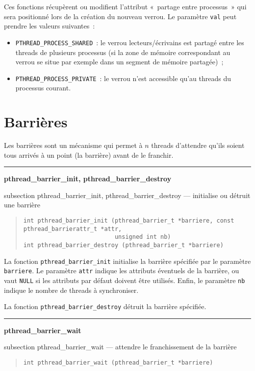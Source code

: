 \documentclass [twoside] {report}
\newcommand {\primitive} [1]
    {
	{\large \bf #1}
	\addcontentsline {toc} {subsection} {#1}
    }
\newcommand {\separation}
    {
	\vspace {7mm}
	\nopagebreak
	\hrule
    }
\begin{document}
Ces fonctions récupèrent ou modifient l'attribut «~partage entre
processus~» qui sera positionné lors de la création du nouveau
verrou. Le paramètre \texttt {val} peut prendre les valeurs suivantes~:

\begin {itemize}
    \item \verb|PTHREAD_PROCESS_SHARED|~: le verrou lecteurs/écrivains
	est partagé entre les threads de plusieurs processus (si la zone
	de mémoire correspondant au verrou se situe par exemple dans un
	segment de mémoire partagée)~;
    \item \verb|PTHREAD_PROCESS_PRIVATE|~: le verrou n'est accessible
	qu'au threads du processus courant.
\end {itemize}


\section {Barrières}

Les barrières sont un mécanisme qui permet à $n$ threads d'attendre
qu'ils soient tous arrivés à un point (la barrière) avant de le
franchir.

\separation
\primitive {pthread\_barrier\_init, pthread\_barrier\_destroy} --- initialise ou détruit une barrière

\begin {quote}
\begin {verbatim}
int pthread_barrier_init (pthread_barrier_t *barriere, const pthread_barrierattr_t *attr,
                          unsigned int nb)
int pthread_barrier_destroy (pthread_barrier_t *barriere)
\end{verbatim}
\end {quote}

La fonction \verb|pthread_barrier_init| initialise la barrière
spécifiée par le paramètre \texttt {barriere}.  Le paramètre \texttt
{attr} indique les attributs éventuels de la barrière, ou vaut \texttt
{NULL} si les attributs par défaut doivent être utilisés. Enfin,
le paramètre \texttt {nb} indique le nombre de threads à synchroniser.

La fonction \verb|pthread_barrier_destroy| détruit la barrière spécifiée.


\separation
\primitive {pthread\_barrier\_wait} --- attendre le franchissement de la barrière

\begin {quote}
\begin {verbatim}
int pthread_barrier_wait (pthread_barrier_t *barriere)
\end{verbatim}
\end {quote}
\end{document}
